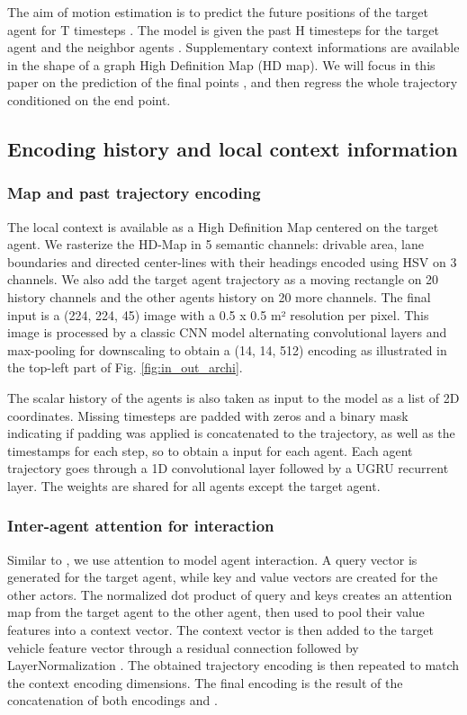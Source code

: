 \documentclass[letterpaper, 10 pt, conference]{ieeeconf}
\begin{document}
The aim of motion estimation is to predict the future positions of the target agent  for T timesteps . The model is given the past H timesteps  for the target agent  and the  neighbor agents .
Supplementary context informations are available in the shape of a graph High Definition Map (HD map). We will focus in this paper on the prediction of the final points , and then regress the whole trajectory conditioned on the end point.

\subsection{Encoding history and local context information}



\subsubsection{Map and past trajectory encoding}

The local context is available as a High Definition Map centered on the target agent.
We rasterize the HD-Map in 5 semantic channels: drivable area, lane boundaries and directed center-lines with their headings encoded using HSV on 3 channels. We also add the target agent trajectory as a moving rectangle on 20 history channels and the other agents history on 20 more channels. The final input is a (224, 224, 45) image with a 0.5 x 0.5 m² resolution per pixel. This image is processed by a classic CNN model alternating convolutional layers and max-pooling for downscaling to obtain a (14, 14, 512) encoding  as illustrated in the top-left part of Fig. \ref{fig:in_out_archi}.

The scalar history of the agents is also taken as input to the model as a list of 2D coordinates. Missing timesteps are padded with zeros and a binary mask indicating if padding was applied is concatenated to the trajectory, as well as the timestamps for each step, so to obtain a  input for each agent. Each agent  trajectory goes through a 1D convolutional layer followed by a UGRU\cite{ugru} recurrent layer. The weights are shared for all agents except the target agent.



\subsubsection{Inter-agent attention for interaction}

Similar to \cite{mercat2020multi, messaoud2020multi, luo2020probabilistic}, we use attention \cite{vaswani2017polosukhin} to model agent interaction. A query vector is generated for the target agent, while key and value vectors are created for the other actors. The normalized dot product of query and keys creates an attention map from the target agent to the other agent, then used to pool their value features into a context vector. The context vector is then added to the target vehicle feature vector through a residual connection followed by LayerNormalization \cite{ba2016layer}. The obtained trajectory encoding  is then repeated to match the context encoding  dimensions. The final encoding  is the result of the concatenation of both encodings  and .
\end{document}
